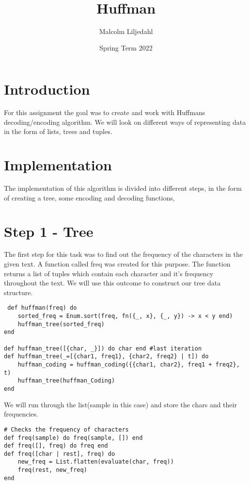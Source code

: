 \documentclass[a4paper,11pt]{article}
\begin{document}
\title{
    \textbf{Huffman}
}
\author{Malcolm Liljedahl}
\date{Spring Term 2022}

\maketitle

\section*{Introduction}
For this assignment the goal was to create and work with Huffmans decoding/encoding algorithm. We will look on different ways of representing data in the form of lists, trees and tuples.

\section{Implementation}
The implementation of this algorithm is divided into different steps, in the form of creating a tree, some encoding and decoding functions,

\section{Step 1 - Tree}
The first step for this task was to find out the frequency of the characters in the given text. A function called freq was created for this purpose. The function returns a list of tuples which contain each character and it's frequency throughout the text. We will use this outcome to construct our tree data structure.

\begin{verbatim}
 def huffman(freq) do
    sorted_freq = Enum.sort(freq, fn({_, x}, {_, y}) -> x < y end)
    huffman_tree(sorted_freq)
end

def huffman_tree([{char, _}]) do char end #last iteration
def huffman_tree(_=[{char1, freq1}, {char2, freq2} | t]) do
    huffman_coding = huffman_coding({{char1, char2}, freq1 + freq2}, t)
    huffman_tree(huffman_Coding)
end
\end{verbatim}

We will run through the list(sample in this case) and store the chars and their frequencies.

\begin{verbatim}
# Checks the frequency of characters
def freq(sample) do freq(sample, []) end
def freq([], freq) do freq end
def freq([char | rest], freq) do
    new_freq = List.flatten(evaluate(char, freq))
    freq(rest, new_freq)
end
\end{verbatim}
\end{document}
